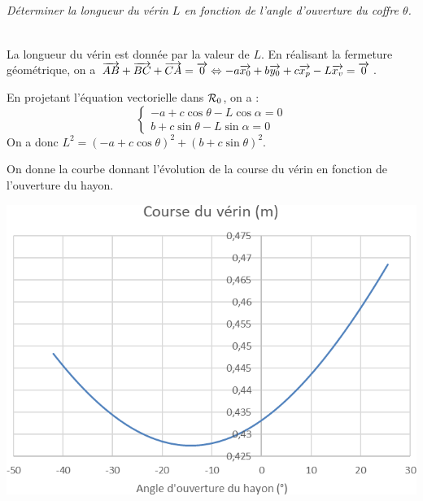 \documentclass[10pt,fleqn]{article} %
\begin{document}
\begin{multicols}{2}
\begin{multicols}{2}
\begin{corrige}
\end{corrige}
\else
\fi


\subparagraph{}
\textit{Déterminer la longueur du vérin $L$ en fonction de l’angle d’ouverture du coffre $\theta$.}
\ifprof
\begin{corrige}~\\
La longueur du vérin est donnée par la valeur de $L$. En réalisant la fermeture géométrique, on a $\overrightarrow{AB}+\overrightarrow{BC}+\overrightarrow{CA}=\overrightarrow{0} \Leftrightarrow 
-a\overrightarrow{x_0}+b\overrightarrow{y_0} + c\overrightarrow{x_p} -L\overrightarrow{x_v} =\overrightarrow{0}$.

En projetant l'équation vectorielle dans $\mathcal{R}_{0}$, on a : 
$$
\left\{ 
\begin{array}{l}
-a + c\cos\theta -L\cos\alpha ={0} \\
b + c\sin\theta -L\sin\alpha ={0}
\end{array}
\right.
$$
On a donc $L^2 =\left(-a + c\cos\theta \right)^2 + \left(b + c\sin\theta \right)^2  $.

\end{corrige}
\else
\fi

On donne la courbe donnant l'évolution de la course du vérin en fonction de l'ouverture du hayon. 
\begin{center}
\includegraphics[width=\linewidth]{images/cor_02}
\end{center}



\end{multicols}
\end{multicols}
\end{document}
